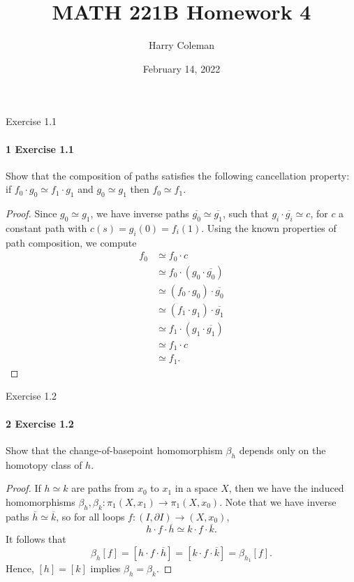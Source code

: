 \documentclass[12pt]{article}
\renewcommand{\maketitle}{\thispagestyle{title}}
\newlength{\myparskip}
\newenvironment{fullbox}{\begin{lrbox}{\savefullbox}\begin{minipage}{\dimexpr\textwidth-2\fboxsep\relax}\setlength{\parskip}{\myparskip}}{\end{minipage}\end{lrbox}\framebox[\textwidth]{\usebox{\savefullbox}}}
\newenvironment{pbox}[1][]{\begin{fullbox}\ifx#1\empty\else\paragraph{#1}\phantom{}\fi}{\end{fullbox}}
\theoremstyle{definition}
\newcommand{\<}{\langle}
\renewcommand{\>}{\rangle}
\newcommand{\htpy}{\simeq}
\newcommand{\bd}{\partial}
\begin{document}
\title{MATH 221B Homework 4}
\author{Harry Coleman\makebox[0pt][r]{\raisebox{-0.25in}[0pt][0pt]{(I worked with Joseph Sullivan and Gahl Shemy)}}}
\date{February 14, 2022}
\maketitle


\begin{pbox}[1 Exercise 1.1]
    Show that the composition of paths satisfies the following cancellation property: if $f_0 \cdot g_0 \htpy f_1 \cdot g_1$ and $g_0 \htpy g_1$ then $f_0 \htpy f_1$.
\end{pbox}

\begin{proof}
    Since $g_0 \htpy g_1$, we have inverse paths $\overline{g_0} \htpy \overline{g_1}$, such that $g_i \cdot \overline{g_i} \htpy c$, for $c$ a constant path with $c(s) = g_i(0) = f_i(1)$.
    Using the known properties of path composition, we compute
    \begin{align*}
        f_0 &\htpy f_0 \cdot c \\
            &\htpy f_0 \cdot (g_0 \cdot \overline{g_0}) \\
            &\htpy (f_0 \cdot g_0) \cdot \overline{g_0} \\
            &\htpy (f_1 \cdot g_1) \cdot \overline{g_1} \\
            &\htpy f_1 \cdot (g_1 \cdot \overline{g_1}) \\
            &\htpy f_1 \cdot c \\
            &\htpy f_1.
    \end{align*}
\end{proof}

\begin{pbox}[2 Exercise 1.2]
    Show that the change-of-basepoint homomorphism $\beta_h$ depends only on the homotopy class of $h$.
\end{pbox}

\begin{proof}
    If $h \htpy k$ are paths from $x_0$ to $x_1$ in a space $X$, then we have the induced homomorphisms  $\beta_h, \beta_k : \pi_1(X, x_1) \to \pi_1(X, x_0)$.
    Note that we have inverse paths $\overline{h} \htpy \overline{k}$, so for all loops $f : (I, \bd I) \to (X, x_0)$,
    \[
        h \cdot f \cdot \overline{h} \htpy k \cdot f \cdot \overline{k}.
    \]
    It follows that
    \[
        \beta_h[f]
            = [h \cdot f \cdot \overline{h}]
            = [k \cdot f \cdot \overline{k}]
            = \beta_{h_1}[f].
    \]
    Hence, $[h] = [k]$ implies $\beta_h = \beta_k$.
\end{proof}
\end{document}
